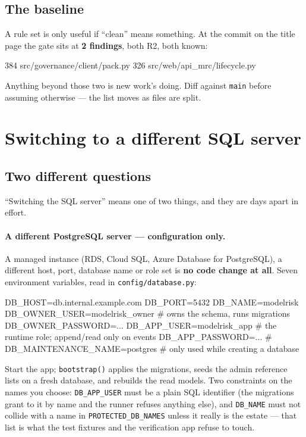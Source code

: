 \documentclass[11pt]{article}
\newcommand{\cfg}[1]{\texttt{#1}}
\begin{document}
\subsection{The baseline}

A rule set is only useful if ``clean'' means something. At the commit on the title page the
gate sits at \textbf{2 findings}, both R2, both known:

\begin{code}
384  src/governance/client/pack.py
326  src/web/api_mrc/lifecycle.py
\end{code}

Anything beyond those two is new work's doing. Diff against \texttt{main} before assuming
otherwise --- the list moves as files are split.

\clearpage
\section{Switching to a different SQL server}
\label{sec:sqlserver}

\subsection{Two different questions}

``Switching the SQL server'' means one of two things, and they are days apart in effort.

\paragraph{A different PostgreSQL server --- configuration only.} A managed instance (RDS,
Cloud SQL, Azure Database for PostgreSQL), a different host, port, database name or role
set is \textbf{no code change at all}. Seven environment variables, read in
\texttt{config/database.py}:

\begin{code}
DB_HOST=db.internal.example.com
DB_PORT=5432
DB_NAME=modelrisk
DB_OWNER_USER=modelrisk_owner        # owns the schema, runs migrations
DB_OWNER_PASSWORD=...
DB_APP_USER=modelrisk_app            # the runtime role; append/read only on events
DB_APP_PASSWORD=...
# DB_MAINTENANCE_NAME=postgres       # only used while creating a database
\end{code}

Start the app; \texttt{bootstrap()} applies the migrations, seeds the admin reference lists
on a fresh database, and rebuilds the read models. Two constraints on the names you choose:
\cfg{DB\_APP\_USER} must be a plain SQL identifier (the migrations grant to it by name and
the runner refuses anything else), and \cfg{DB\_NAME} must not collide with a name in
\texttt{PROTECTED\_DB\_NAMES} unless it really is the estate --- that list is what the test
fixtures and the verification app refuse to touch.
\end{document}
